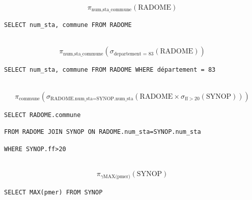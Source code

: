 \ifprof
\begin{corrige}
\question\
$$ \pi_{\text{num},\text{sta\_commune}}\left( \text{RADOME} \right) $$

\begin{center}
\texttt{SELECT num\_sta, commune FROM RADOME}
\end{center}

\question\
$$ \pi_{\text{num},\text{sta\_commune}}\left(\sigma_{\text{departement = 83}} \left(\text{RADOME} \right)\right) $$

\begin{center}
\texttt{SELECT num\_sta, commune FROM RADOME WHERE département = 83}
\end{center}

\question\
$$ \pi_{\text{commune}}\left(\sigma_{\text{RADOME.num\_sta=SYNOP.num\_sta}} \left(\text{RADOME} \times 
\sigma_{\text{ff}>20}\left(\text{SYNOP} \right) \right)\right) $$

\hspace{1cm} \texttt{SELECT RADOME.commune}

\hspace{2cm} \texttt{FROM RADOME JOIN SYNOP ON RADOME.num\_sta=SYNOP.num\_sta}

\hspace{2cm} \texttt{WHERE SYNOP.ff>20}

\question\
$$ \pi_{\gamma \text{MAX(pmer)}}\left(\text{SYNOP}\right) $$

\begin{center}
\texttt{SELECT MAX(pmer) FROM SYNOP}
\end{center}

\end{corrige}
\else
\fi
%
%
%
